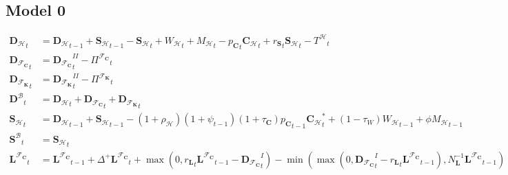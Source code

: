 \documentclass[a4paper, headings=standardclasses]{scrartcl}
\numberwithin{equation}{subsection}
\begin{document}
\subsection{Model 0}
{\allowdisplaybreaks \tiny
	\begin{align}
		{\mathbf{D}_\mathcal{H}}_t                        & = {\mathbf{D}_\mathcal{H}}_{t-1} + {\mathbf{S}_\mathcal{H}}_{t-1} - {\mathbf{S}_\mathcal{H}}_t + {W_\mathcal{H}} _t + {M_\mathcal{H}} _t - {p_\mathbf{C}}_t {\mathbf{C}_\mathcal{H}}_t + {r_\mathbf{S}}_t {\mathbf{S}_\mathcal{H}}_t - {T^\mathcal{H}}_t                                           \\
		{\mathbf{D}_{\mathcal{F}_\mathbf{C}}}_t           & = {\mathbf{D}_{\mathcal{F}_\mathbf{C}}}^{II}_t - {\Pi^{\mathcal{F}_\mathbf{C}}}_t \\
		{\mathbf{D}_{\mathcal{F}_\mathbf{K}}}_t           & =  {\mathbf{D}_{\mathcal{F}_\mathbf{K}}}^{II}_t - {\Pi^{\mathcal{F}_\mathbf{K}}}_t \\
		{\mathbf{D}^\mathcal{B}}_t                        & = {\mathbf{D}_\mathcal{H}}_t + {\mathbf{D}_{\mathcal{F}_\mathbf{C}}}_t + {\mathbf{D}_{\mathcal{F}_\mathbf{K}}}_t                                                                                                                                                              \\
		{\mathbf{S}_\mathcal{H}}_t                        & = {\mathbf{D}_\mathcal{H}}_{t-1} + {\mathbf{S}_\mathcal{H}}_{t-1} - (1 + \rho_\mathcal{H}) (1 + \psi_{t-1}) (1 + \tau_\mathbf{C}) {p_\mathbf{C}}_{t-1} {\mathbf{C}_\mathcal{H}}_t^* + (1-\tau_W) {W_\mathcal{H}}_{t-1} + \phi {M_\mathcal{H}}_{t-1} \\
		{\mathbf{S}^\mathcal{B}}_t                        & = {\mathbf{S}_\mathcal{H}}_t                                                                                                                                                                                                                                                  \\
		{\mathbf{L}^{\mathcal{F}_\mathbf{C}}}_t           & = {\mathbf{L}^{\mathcal{F}_\mathbf{C}}}_{t-1} + \Delta^+{\mathbf{L}^{\mathcal{F}_\mathbf{C}}}_t + \max(0, {r_\mathbf{L}}_t {\mathbf{L}^{\mathcal{F}_\mathbf{C}}}_{t-1} - {\mathbf{D}_{\mathcal{F}_\mathbf{C}}}^{I}_t) - \min(\max(0, {\mathbf{D}_{\mathcal{F}_\mathbf{C}}}^{I}_t - {r_\mathbf{L}}_t {\mathbf{L}^{\mathcal{F}_\mathbf{C}}}_{t-1}), N_\mathbf{L}^{-1} {\mathbf{L}^{\mathcal{F}_\mathbf{C}}}_{t-1})\\

\end{align}}
\end{document}
